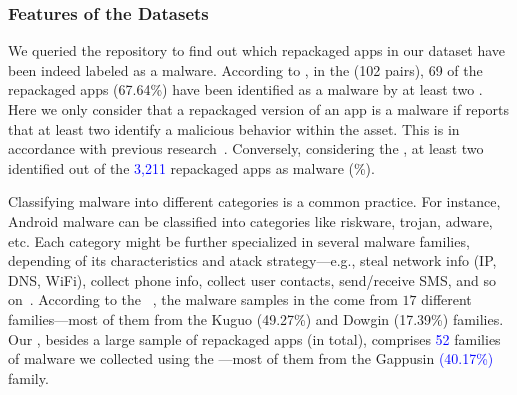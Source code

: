 

\subsubsection{Features of the Datasets}
 
We queried the \vt repository to find out which repackaged apps in our
dataset have been indeed labeled as a malware.
According to \vt, in the \sds (102 pairs),
69 of the repackaged apps (67.64\%) have been identified as a malware by at least two
\ses. Here we only consider that a repackaged version of an app is a malware if \vt reports that at least
two \ses identify a malicious behavior within the asset. This is in accordance with previous research~\cite{vt-label,DBLP:journals/ese/KhanmohammadiEH19}. Conversely, considering the \cds, at least two \se identified \malwares out of the \textcolor{blue}{3,211} repackaged apps as malware (\malwaresP\%).

Classifying malware into different categories is a common practice. For instance, Android malware can be classified into categories
like riskware, trojan, adware, etc. Each category might be further specialized in several malware families, depending of its
characteristics and atack strategy---e.g., steal network info (IP, DNS, WiFi), collect phone info,
collect user contacts, send/receive SMS, and so on~\cite{DBLP:conf/iccns/RahaliLKTGM20}.
According to the
\avt~\cite{avclass2-paper}, the malware samples in the \sds come from $17$ different families---most of them from the Kuguo (49.27\%) and Dowgin (17.39\%) families.  
Our \cds, besides a large sample of repackaged apps (\apps in total),
comprises \textcolor{blue}{52} families of malware we collected using the \avt---most
of them from the Gappusin \textcolor{blue}{(40.17\%)} family.

